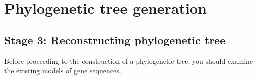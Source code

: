 % 
% 

\section{Phylogenetic tree generation}

\subsection{Stage 3: Reconstructing phylogenetic tree}

Before proceeding to the construction of a phylogenetic tree, you should examine the 
existing models of gene sequences.

